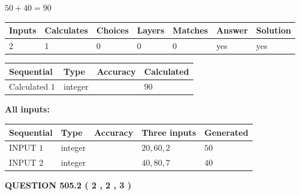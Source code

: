 \documentclass[12pt]{article}
\begin{document}
 

$ %
50 +  %
40=   %
90$
 
 
\noindent{}
 
 

 
   
   
   
   
\noindent\begin{tabular}{|l|l|l|l|l|l|l|}
 \hline
Inputs & Calculates & Choices & Layers & Matches & Answer & Solution \\ \hline
 2  & 
 1  & 
 0
  & 
 0  & 
 0  & 
  yes & 
  yes 
  \\ \hline
 \end{tabular}
   
   
   
   
\noindent{}
   
   
  
  
\noindent\begin{tabular}{|l|l|l|l|}
\hline
 Sequential & Type & Accuracy & Calculated \\ 
\hline
 
 
  Calculated $  1 $ & integer &  & 
  $ 90 $ 
 \\  \hline  
 \end{tabular}
   
   
   
   
\noindent\vspace{0.1in}\hspace{-0.08in} {\textbf{\Large{All inputs: }}}
   
   
  
  
\noindent\begin{tabular}{|l|l|l|l|l|}
\hline
 Sequential & Type & Accuracy & Three inputs & Generated \\ 
\hline
 
 
  INPUT $  1 $ & integer &  & $
 20
 , 
 60
 , 
 2
 $ & $ 50 $ 
 \\  \hline  
 
 
  INPUT $  2 $ & integer &  & $
 40
 , 
 80
 , 
 7
 $ & $ 40 $ 
 \\  \hline  
 \end{tabular}
   
   
  
\vspace{0.2in}
  
{\textbf{\Large{QUESTION
505.2 
 ( 2 , 2 , 3 )
}}}
  
\end{document}
